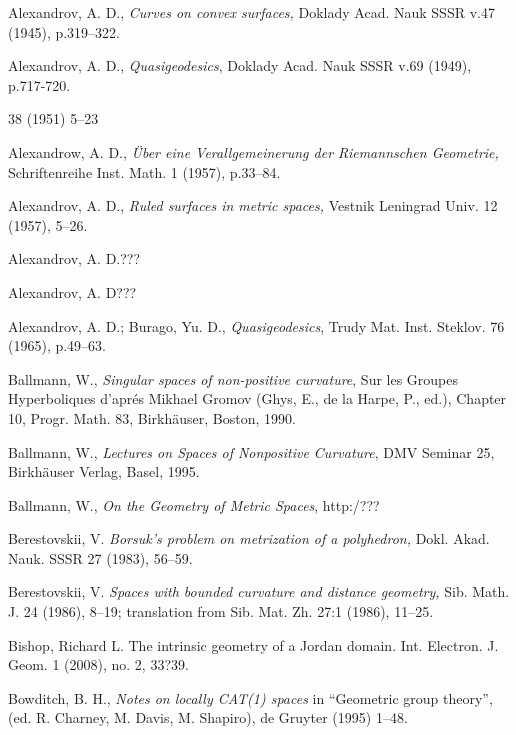 \begin{thebibliography}{52}
 Alexandrov, A. D., \textit{Curves on convex surfaces,} Doklady Acad. Nauk SSSR v.47 (1945), p.319--322.

 Alexandrov, A. D., \textit{Quasigeodesics}, Doklady Acad. Nauk SSSR v.69 (1949),
p.717-720.

38 (1951) 5--23

 Alexandrow, A. D.,  \textit{\"Uber eine Verallgemeinerung der Riemannschen Geometrie,}
Schriftenreihe Inst. Math. 1 (1957), p.33--84.

 Alexandrov, A. D., \textit{Ruled surfaces in metric spaces,}
Vestnik Leningrad Univ. 12  (1957), 5--26.

 Alexandrov, A. D.???

 Alexandrov, A. D???

 Alexandrov, A. D.; Burago, Yu. D., \textit{Quasigeodesics}, Trudy Mat. Inst. Steklov.
76 (1965), p.49--63.

Ballmann, W., \textit{Singular spaces of non-positive curvature}, Sur les Groupes Hyperboliques d'apr\'{e}s Mikhael Gromov (Ghys, E., de la Harpe, P., ed.), Chapter 10, Progr. Math. 83, Birkh\"auser, Boston, 1990. 


Ballmann, W., \textit{Lectures on Spaces of Nonpositive Curvature}, DMV Seminar 25, Birkh\"auser Verlag, Basel, 1995. 

Ballmann, W., \textit{On the Geometry of Metric Spaces}, http:/???

 Berestovskii, V. 
\textit{Borsuk's problem on metrization of a polyhedron,}  
Dokl. Akad. Nauk. SSSR 27 (1983), 56--59.

 Berestovskii, V. 
\textit{Spaces with bounded curvature and distance geometry,}  
Sib. Math. J. 24 (1986), 8--19;
translation from Sib. Mat. Zh. 27:1 (1986), 11--25.

Bishop, Richard L. The intrinsic geometry of a Jordan domain. Int. Electron. J. Geom. 1 (2008), no. 2, 33?39.

 Bowditch, B. H.,
\textit{Notes on locally CAT(1) spaces} 
in ``Geometric group theory'', (ed. R. Charney, M. Davis, M. Shapiro), de Gruyter (1995) 1--48.


\end{thebibliography}
